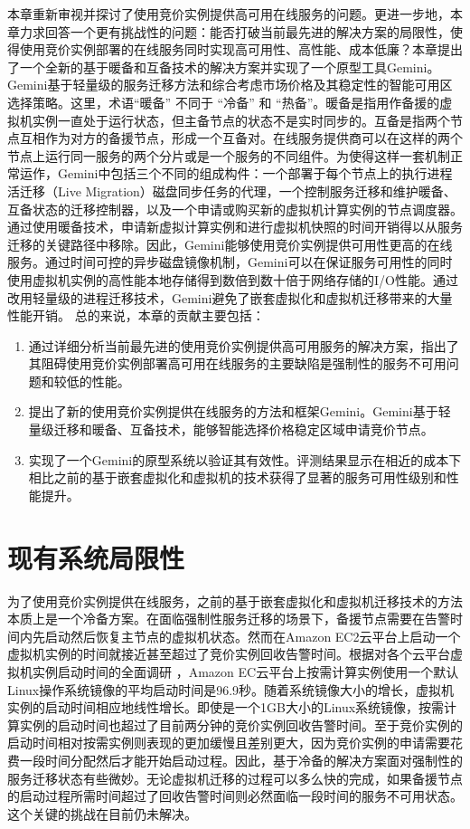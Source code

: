 本章重新审视并探讨了使用竞价实例提供高可用在线服务的问题。更进一步地，本章力求回答一个更有挑战性的问题：能否打破当前最先进的解决方案的局限性，使得使用竞价实例部署的在线服务同时实现高可用性、高性能、成本低廉？本章提出了一个全新的基于暖备和互备技术的解决方案并实现了一个原型工具Gemini。Gemini基于轻量级的服务迁移方法和综合考虑市场价格及其稳定性的智能可用区选择策略。这里，术语``暖备'' 不同于 ``冷备'' 和 ``热备''。暖备是指用作备援的虚拟机实例一直处于运行状态，但主备节点的状态不是实时同步的。互备是指两个节点互相作为对方的备援节点，形成一个互备对。在线服务提供商可以在这样的两个节点上运行同一服务的两个分片或是一个服务的不同组件。为使得这样一套机制正常运作，Gemini中包括三个不同的组成构件：一个部署于每个节点上的执行进程活迁移（Live Migration）磁盘同步任务的代理，一个控制服务迁移和维护暖备、互备状态的迁移控制器，以及一个申请或购买新的虚拟机计算实例的节点调度器。通过使用暖备技术，申请新虚拟计算实例和进行虚拟机快照的时间开销得以从服务迁移的关键路径中移除。因此，Gemini能够使用竞价实例提供可用性更高的在线服务。通过时间可控的异步磁盘镜像机制，Gemini可以在保证服务可用性的同时使用虚拟机实例的高性能本地存储得到数倍到数十倍于网络存储的I/O性能。通过改用轻量级的进程迁移技术，Gemini避免了嵌套虚拟化和虚拟机迁移带来的大量性能开销。
总的来说，本章的贡献主要包括：

\begin{enumerate}
\item 通过详细分析当前最先进的使用竞价实例提供高可用服务的解决方案，指出了其阻碍使用竞价实例部署高可用在线服务的主要缺陷是强制性的服务不可用问题和较低的性能。
\item 提出了新的使用竞价实例提供在线服务的方法和框架Gemini。Gemini基于轻量级迁移和暖备、互备技术，能够智能选择价格稳定区域申请竞价节点。
\item 实现了一个Gemini的原型系统以验证其有效性。评测结果显示在相近的成本下相比之前的基于嵌套虚拟化和虚拟机的技术获得了显著的服务可用性级别和性能提升。
\end{enumerate}

\section{现有系统局限性}
\label{sec:gemini_challenges}
为了使用竞价实例提供在线服务，之前的基于嵌套虚拟化和虚拟机迁移技术的方法\cite{He:2015:CCH:2749246.2749275}本质上是一个冷备方案。在面临强制性服务迁移的场景下，备援节点需要在告警时间内先启动然后恢复主节点的虚拟机状态。然而在Amazon EC2云平台上启动一个虚拟机实例的时间就接近甚至超过了竞价实例回收告警时间。根据对各个云平台虚拟机实例启动时间的全面调研 \cite{Mao:2012:PSV:2353730.2353859}，Amazon EC云平台上按需计算实例使用一个默认Linux操作系统镜像的平均启动时间是96.9秒。随着系统镜像大小的增长，虚拟机实例的启动时间相应地线性增长。即使是一个1GB大小的Linux系统镜像，按需计算实例的启动时间也超过了目前两分钟的竞价实例回收告警时间。至于竞价实例的启动时间相对按需实例则表现的更加缓慢且差别更大，因为竞价实例的申请需要花费一段时间分配然后才能开始启动过程。因此，基于冷备的解决方案面对强制性的服务迁移状态有些微妙。无论虚拟机迁移的过程可以多么快的完成，如果备援节点的启动过程所需时间超过了回收告警时间则必然面临一段时间的服务不可用状态。这个关键的挑战在目前仍未解决。

